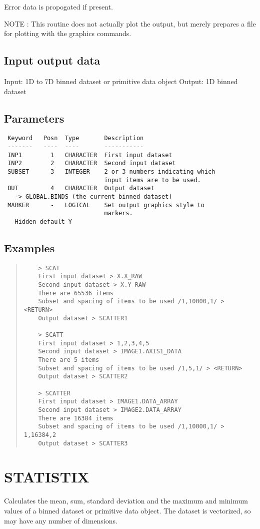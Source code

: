 \documentclass{book}
\renewcommand{\_}{{\tt\char'137}}     %
\begin{document}
Error data is propogated if present.

NOTE : This routine does not actually plot the output,
but merely prepares a file for plotting with the
graphics commands.

\subsection{Input output data}
Input: 1D to 7D binned dataset or primitive data object
Output: 1D binned dataset
\subsection{Parameters}
\begin{verbatim}
 Keyword   Posn  Type       Description
 -------   ----  ----       -----------
 INP1        1   CHARACTER  First input dataset
 INP2        2   CHARACTER  Second input dataset
 SUBSET      3   INTEGER    2 or 3 numbers indicating which
                            input items are to be used.
 OUT         4   CHARACTER  Output dataset
   -> GLOBAL.BINDS (the current binned dataset)
 MARKER      -   LOGICAL    Set output graphics style to
                            markers.
   Hidden default Y

\end{verbatim}\subsection{Examples}
\begin{quote}\begin{verbatim}
    > SCAT
    First input dataset > X.X_RAW
    Second input dataset > X.Y_RAW
    There are 65536 items
    Subset and spacing of items to be used /1,10000,1/ > <RETURN>
    Output dataset > SCATTER1

    > SCATT
    First input dataset > 1,2,3,4,5
    Second input dataset > IMAGE1.AXIS1_DATA
    There are 5 items
    Subset and spacing of items to be used /1,5,1/ > <RETURN>
    Output dataset > SCATTER2

    > SCATTER
    First input dataset > IMAGE1.DATA_ARRAY
    Second input dataset > IMAGE2.DATA_ARRAY
    There are 16384 items
    Subset and spacing of items to be used /1,10000,1/ > 1,16384,2
    Output dataset > SCATTER3
\end{verbatim}\end{quote}
\section{STATISTIX}
Calculates the mean, sum, standard deviation and the maximum and
minimum values of a binned dataset or primitive data object. The
dataset is vectorized, so may have any number of dimensions.
\end{document}
